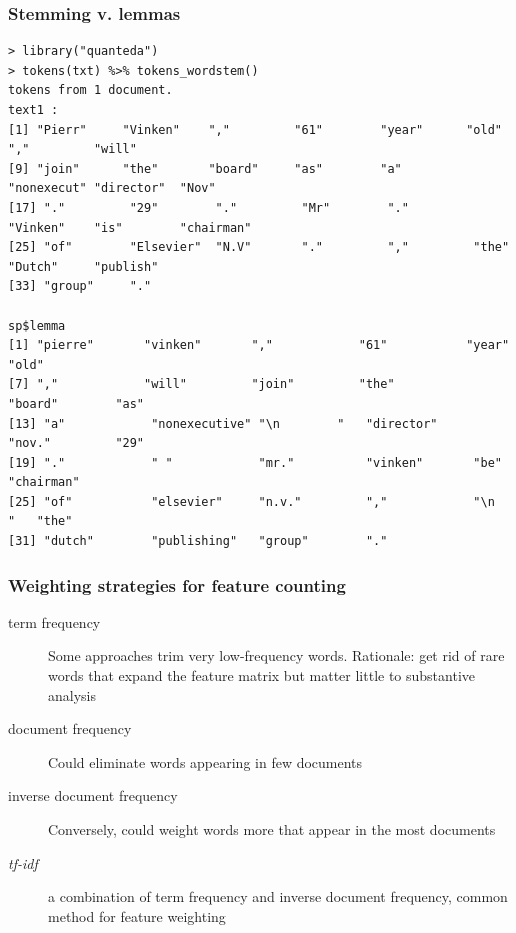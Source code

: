 \documentclass[11pt,handout]{beamer}
\begin{document}
\begin{frame}[fragile]
 \frametitle{Stemming v. lemmas}
 \scriptsize
 \begin{verbatim}
> library("quanteda")
> tokens(txt) %>% tokens_wordstem()
tokens from 1 document.
text1 :
[1] "Pierr"     "Vinken"    ","         "61"        "year"      "old"       ","         "will"
[9] "join"      "the"       "board"     "as"        "a"         "nonexecut" "director"  "Nov"
[17] "."         "29"        "."         "Mr"        "."         "Vinken"    "is"        "chairman"
[25] "of"        "Elsevier"  "N.V"       "."         ","         "the"       "Dutch"     "publish"
[33] "group"     "."

sp$lemma
[1] "pierre"       "vinken"       ","            "61"           "year"         "old"
[7] ","            "will"         "join"         "the"          "board"        "as"
[13] "a"            "nonexecutive" "\n        "   "director"     "nov."         "29"
[19] "."            " "            "mr."          "vinken"       "be"           "chairman"
[25] "of"           "elsevier"     "n.v."         ","            "\n        "   "the"
[31] "dutch"        "publishing"   "group"        "."
\end{verbatim}
\end{frame}




\begin{frame}
 \frametitle{Weighting strategies for feature counting}
 \begin{description}
  \item[term frequency] Some approaches trim very low-frequency words.
  Rationale: get rid of rare words that expand the feature matrix
  but matter little to substantive analysis
  \item[document frequency] Could eliminate words appearing in few documents
  \item[inverse document frequency] Conversely, could weight words
  more that appear in the most documents
  \item[\emph{tf-idf}] a combination of term frequency and inverse
  document frequency, common method for feature weighting
 \end{description}
\end{frame}
\end{document}
